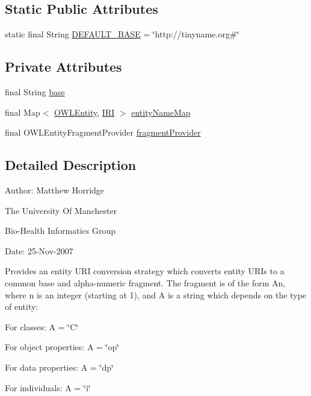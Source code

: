 \subsection*{Static Public Attributes}
\begin{DoxyCompactItemize}
\item 
static final String \hyperlink{classorg_1_1semanticweb_1_1owlapi_1_1util_1_1_o_w_l_entity_tiny_u_r_i_conversion_strategy_a30891d374e6f382d6c2b7267e53d36de}{D\-E\-F\-A\-U\-L\-T\-\_\-\-B\-A\-S\-E} = \char`\"{}http\-://tinyname.\-org\#\char`\"{}
\end{DoxyCompactItemize}
\subsection*{Private Attributes}
\begin{DoxyCompactItemize}
\item 
final String \hyperlink{classorg_1_1semanticweb_1_1owlapi_1_1util_1_1_o_w_l_entity_tiny_u_r_i_conversion_strategy_af2330d80d95c71ff6ef1bd36d2556d78}{base}
\item 
final Map$<$ \hyperlink{interfaceorg_1_1semanticweb_1_1owlapi_1_1model_1_1_o_w_l_entity}{O\-W\-L\-Entity}, \hyperlink{classorg_1_1semanticweb_1_1owlapi_1_1model_1_1_i_r_i}{I\-R\-I} $>$ \hyperlink{classorg_1_1semanticweb_1_1owlapi_1_1util_1_1_o_w_l_entity_tiny_u_r_i_conversion_strategy_a1d6ebb6cda9659f936226b6e7638db66}{entity\-Name\-Map}
\item 
final O\-W\-L\-Entity\-Fragment\-Provider \hyperlink{classorg_1_1semanticweb_1_1owlapi_1_1util_1_1_o_w_l_entity_tiny_u_r_i_conversion_strategy_a45e57d09134669be56f4e4e963bdedc8}{fragment\-Provider}
\end{DoxyCompactItemize}


\subsection{Detailed Description}
Author\-: Matthew Horridge\par
 The University Of Manchester\par
 Bio-\/\-Health Informatics Group\par
 Date\-: 25-\/\-Nov-\/2007\par
 \par
 

Provides an entity U\-R\-I conversion strategy which converts entity U\-R\-Is to a common base and alpha-\/numeric fragment. The fragment is of the form An, where n is an integer (starting at 1), and A is a string which depends on the type of entity\-: 
\begin{DoxyItemize}
\item For classes\-: A = \char`\"{}\-C\char`\"{} 
\item For object properties\-: A = \char`\"{}op\char`\"{} 
\item For data properties\-: A = \char`\"{}dp\char`\"{} 
\item For individuals\-: A = \char`\"{}i\char`\"{} 
\end{DoxyItemize}

